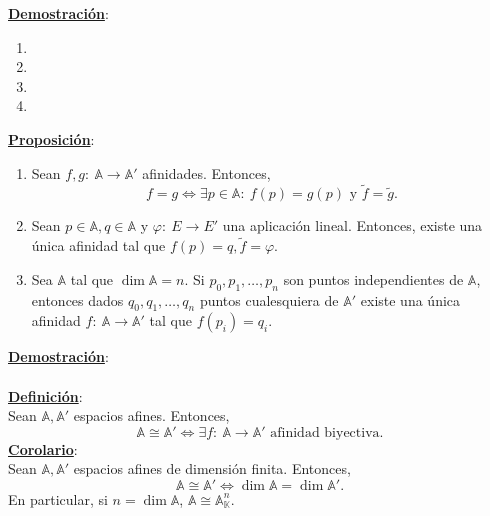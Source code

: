\documentclass[11pt]{article}
\newcommand{\af}{\mathbb{A}}
\newcommand{\defi}{\underline{\textbf{Definición}}:\\}
\newcommand{\prop}{\underline{\textbf{Proposición}}:\\}
\newcommand{\dem}{\underline{\textbf{Demostración}}:\\}
\newcommand{\cor}{\underline{\textbf{Corolario}}:\\}
\DeclareMathOperator{\cuerpo}{\mathbb{K}}
\begin{document}
\dem \begin{enumerate}
	\item 
	\item 
	\item 
	\item 
\end{enumerate}
\prop
\begin{enumerate}
	\item Sean $f,g:\ \af\rightarrow\af'$ afinidades. Entonces,
	$$f=g\iff\exists p\in\af:\ f(p)=g(p)\textrm{ y }\tilde{f}=\tilde{g}.$$
	\item Sean $p\in\af,q\in\af$ y $\varphi:\ E\rightarrow E'$ una aplicación lineal. Entonces, existe una única afinidad tal que $f(p)=q,\tilde{f}=\varphi.$
	\item Sea $\af$ tal que $\dim\af=n$. Si $p_0,p_1,\ldots,p_n$ son puntos independientes de $\af$, entonces dados $q_0,q_1,\ldots,q_n$ puntos cualesquiera de $\af'$ existe una única afinidad $f:\ \af\rightarrow\af'$ tal que $f(p_i)=q_i$.
\end{enumerate}
\dem \\
\defi Sean $\af,\af'$ espacios afines. Entonces,
$$\af\cong\af'\iff\exists f:\ \af\rightarrow\af'\textrm{ afinidad biyectiva.}$$
\cor Sean $\af,\af'$ espacios afines de dimensión finita. Entonces,
$$\af\cong\af'\iff\dim\af=\dim\af'.$$
En particular, si $n=\dim\af$, $\af\cong\af^n_{\cuerpo}$.
\newpage
\end{document}
